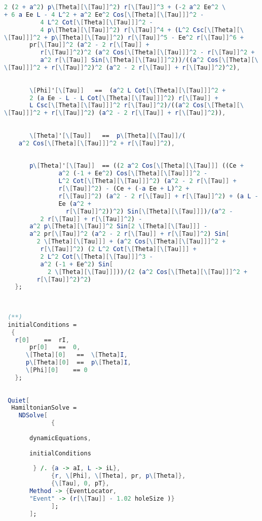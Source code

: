 \begin{lstlisting}[language=Mathematica,stepnumber=1,]
          2 (2 + a^2) p\[Theta][\[Tau]]^2) r[\[Tau]]^3 + (-2 a^2 Ee^2 \
+ 6 a Ee L - 4 L^2 + a^2 Ee^2 Cos[\[Theta][\[Tau]]]^2 - 
          4 L^2 Cot[\[Theta][\[Tau]]]^2 - 
          4 p\[Theta][\[Tau]]^2) r[\[Tau]]^4 + (L^2 Csc[\[Theta][\
\[Tau]]]^2 + p\[Theta][\[Tau]]^2) r[\[Tau]]^5 - Ee^2 r[\[Tau]]^6 + 
       pr[\[Tau]]^2 (a^2 - 2 r[\[Tau]] + 
          r[\[Tau]]^2)^2 (a^2 Cos[\[Theta][\[Tau]]]^2 - r[\[Tau]]^2 + 
          a^2 r[\[Tau]] Sin[\[Theta][\[Tau]]]^2))/((a^2 Cos[\[Theta][\
\[Tau]]]^2 + r[\[Tau]]^2)^2 (a^2 - 2 r[\[Tau]] + r[\[Tau]]^2)^2),
   
   
       \[Phi]'[\[Tau]]   ==  (a^2 L Cot[\[Theta][\[Tau]]]^2 + 
       2 (a Ee - L - L Cot[\[Theta][\[Tau]]]^2) r[\[Tau]] + 
       L Csc[\[Theta][\[Tau]]]^2 r[\[Tau]]^2)/((a^2 Cos[\[Theta][\
\[Tau]]]^2 + r[\[Tau]]^2) (a^2 - 2 r[\[Tau]] + r[\[Tau]]^2)),
   
   
       \[Theta]'[\[Tau]]   ==  p\[Theta][\[Tau]]/(
    a^2 Cos[\[Theta][\[Tau]]]^2 + r[\[Tau]]^2),
   
   
       p\[Theta]'[\[Tau]]  == ((2 a^2 Cos[\[Theta][\[Tau]]] ((Ce + 
               a^2 (-1 + Ee^2) Cos[\[Theta][\[Tau]]]^2 - 
               L^2 Cot[\[Theta][\[Tau]]]^2) (a^2 - 2 r[\[Tau]] + 
               r[\[Tau]]^2) - (Ce + (-a Ee + L)^2 + 
               r[\[Tau]]^2) (a^2 - 2 r[\[Tau]] + r[\[Tau]]^2) + (a L -
               Ee (a^2 + 
                 r[\[Tau]]^2))^2) Sin[\[Theta][\[Tau]]])/(a^2 - 
          2 r[\[Tau]] + r[\[Tau]]^2) - 
       a^2 p\[Theta][\[Tau]]^2 Sin[2 \[Theta][\[Tau]]] - 
       a^2 pr[\[Tau]]^2 (a^2 - 2 r[\[Tau]] + r[\[Tau]]^2) Sin[
         2 \[Theta][\[Tau]]] + (a^2 Cos[\[Theta][\[Tau]]]^2 + 
          r[\[Tau]]^2) (2 L^2 Cot[\[Theta][\[Tau]]] + 
          2 L^2 Cot[\[Theta][\[Tau]]]^3 - 
          a^2 (-1 + Ee^2) Sin[
            2 \[Theta][\[Tau]]]))/(2 (a^2 Cos[\[Theta][\[Tau]]]^2 + 
         r[\[Tau]]^2)^2)
   };
 
 
 
 (**)
 initialConditions =
  {
   r[0]    ==  rI,
       pr[0]   ==  0,
      \[Theta][0]   ==  \[Theta]I,
      p\[Theta][0]  ==  p\[Theta]I,
      \[Phi][0]    == 0
   };
 
 
 Quiet[
  HamiltonianSolve =
    NDSolve[
             {
       
       dynamicEquations,
       
       initialConditions
       
        } /. {a -> aI, L -> iL},
             {r, \[Phi], \[Theta], pr, p\[Theta]},
             {\[Tau], 0, pT},
       Method -> {EventLocator, 
       "Event" -> (r[\[Tau]] - 1.02 holeSize )}
             ];
       ];
 

\end{lstlisting}
